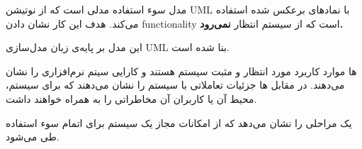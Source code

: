 مدل سوء استفاده مدلی است که از نوتیشن UML با نماد‌های برعکس شده استفاده می‌کند. هدف این کار نشان دادن functionality است که از سیستم انتظار 
\textbf{نمی‌رود.}

این مدل بر پایه‌ی زبان مدل‌سازی UML بنا شده است.

ها موارد کاربرد مورد انتظار و مثبت سیستم هستند و کارایی سیتم نرم‌افزاری را نشان می‌دهند. در مقابل
ها جزئیات تعاملاتی با سیستم را نشان می‌دهند که برای سیستم، محیط آن یا کاربران آن مخاطراتی را به همراه خواهند داشت.

یک
مراحلی را نشان می‌دهد که از امکانات مجاز یک سیستم برای اتمام سوء استفاده طی می‌شود.

\cite{umlsec}
